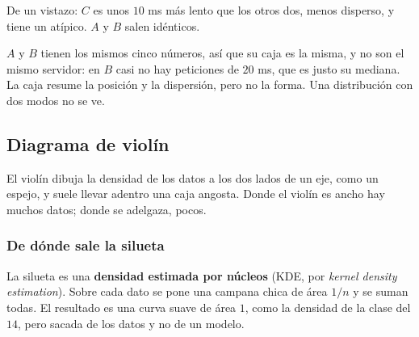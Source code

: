 \documentclass[11pt,letterpaper]{article}
\begin{document}
\begin{ejemplo}
\begin{center}
    \end{center}
    De un vistazo: $C$ es unos $10$ ms más lento que los otros dos,
    menos disperso, y tiene un atípico. $A$ y $B$ salen idénticos.
\end{ejemplo}

\begin{ojo}
    $A$ y $B$ tienen los mismos cinco números, así que su caja es la
    misma, y no son el mismo servidor: en $B$ casi no hay peticiones
    de $20$ ms, que es justo su mediana. La caja resume la posición y
    la dispersión, pero no la forma. Una distribución con dos modos
    no se ve.
\end{ojo}


\subsection*{Diagrama de violín}

El violín dibuja la densidad de los datos a los dos lados de un eje,
como un espejo, y suele llevar adentro una caja angosta. Donde el
violín es ancho hay muchos datos; donde se adelgaza, pocos.

\subsubsection*{De dónde sale la silueta}

La silueta es una \textbf{densidad estimada por núcleos} (KDE, por
\textit{kernel density estimation}). Sobre cada dato se pone una
campana chica de área $1/n$ y se suman todas. El resultado es una
curva suave de área $1$, como la densidad de la clase del $14$, pero
sacada de los datos y no de un modelo.
\end{document}
